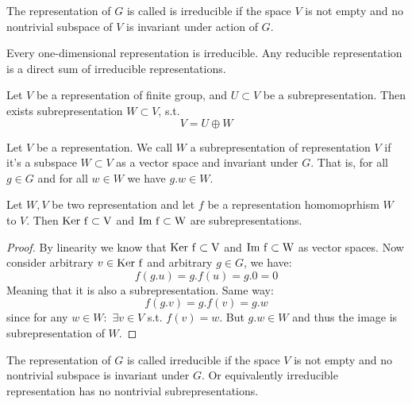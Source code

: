 \documentclass{amsart}
\def\ker{\rm Ker\ }
\def\im{\rm Im}
\begin{document}
\begin{definition}

The representation of $G$ is called is irreducible if the space $V$ is not empty and no nontrivial subspace of $V$ is invariant under action of $G$.
    
\end{definition}

\begin{lemma}
    Every one-dimensional representation is irreducible. Any reducible representation is a direct sum of irreducible representations.
\end{lemma}

\begin{theorem}
    Let $V$ be a representation of finite group, and $U \subset V$ be a subrepresentation. Then exists subrepresentation $W\subset V$, s.t.
    $$ V = U \oplus W$$
\end{theorem}


    \begin{definition}
        Let $V$ be a representation. We call $W$ a subrepresentation of representation $V$ if it's a subspace $W\subset V$ as a vector space and invariant under $G$. That is, for all $g \in G$ and for all $w \in W$ we have $g.w \in W$.
    \end{definition}

    \begin{lemma}
        Let $W, V$ be two representation and let $f$ be a representation homomoprhism $W$ to $V$. Then $\ker f \subset V$ and $\im \ f \subset W$ are subrepresentations.
    \end{lemma}

    \begin{proof}
        By linearity we know that $\ker f \subset V$ and $\im\ f \subset W$ as vector spaces. Now consider arbitrary $v \in \ker f$ and arbitrary $g \in G$, we have:
        $$ f(g.u) = g . f(u) = g . 0 = 0$$
        Meaning that it is also a subrepresentation. Same way:
        $$ f(g.v) = g. f(v) = g.w$$
        since for any $w \in W:$ $\exists v \in V$ s.t. $f(v)=w$. But $g.w \in W$ and thus the image is subrepresentation of $W$.
    \end{proof}

    \begin{definition}
        The representation of $G$ is called irreducible if the space $V$ is not empty and no nontrivial subspace is invariant under $G$. Or equivalently irreducible representation has no nontrivial subrepresentations.
    \end{definition}
\end{document}
